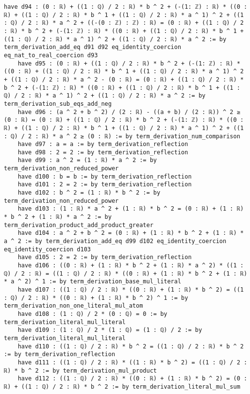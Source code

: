 \documentclass{article}
\begin{document}
\begin{tcolorbox}[colback=white!10, width=\linewidth]
\begin{lstlisting}[language=Lean4]
    have d94 : (0 : ℝ) + ((1 : ℚ) / 2 : ℝ) * b ^ 2 + (-(1: ℤ) : ℝ) * ((0 : ℝ) + ((1 : ℚ) / 2 : ℝ) * b ^ 1 + ((1 : ℚ) / 2 : ℝ) * a ^ 1) ^ 2 + ((1 : ℚ) / 2 : ℝ) * a ^ 2 + ((-(0 : ℤ) : ℤ) : ℝ) = (0 : ℝ) + ((1 : ℚ) / 2 : ℝ) * b ^ 2 + (-(1: ℤ) : ℝ) * ((0 : ℝ) + ((1 : ℚ) / 2 : ℝ) * b ^ 1 + ((1 : ℚ) / 2 : ℝ) * a ^ 1) ^ 2 + ((1 : ℚ) / 2 : ℝ) * a ^ 2 := by term_derivation_add_eq d91 d92 eq_identity_coercion eq_nat_to_real_coercion d93
    have d95 : (0 : ℝ) + ((1 : ℚ) / 2 : ℝ) * b ^ 2 + (-(1: ℤ) : ℝ) * ((0 : ℝ) + ((1 : ℚ) / 2 : ℝ) * b ^ 1 + ((1 : ℚ) / 2 : ℝ) * a ^ 1) ^ 2 + ((1 : ℚ) / 2 : ℝ) * a ^ 2 - (0 : ℝ) = (0 : ℝ) + ((1 : ℚ) / 2 : ℝ) * b ^ 2 + (-(1: ℤ) : ℝ) * ((0 : ℝ) + ((1 : ℚ) / 2 : ℝ) * b ^ 1 + ((1 : ℚ) / 2 : ℝ) * a ^ 1) ^ 2 + ((1 : ℚ) / 2 : ℝ) * a ^ 2 := by term_derivation_sub_eqs_add_neg
    have d96 : (a ^ 2 + b ^ 2) / (2 : ℝ) - ((a + b) / (2 : ℝ)) ^ 2 ≥ (0 : ℝ) ↔ (0 : ℝ) + ((1 : ℚ) / 2 : ℝ) * b ^ 2 + (-(1: ℤ) : ℝ) * ((0 : ℝ) + ((1 : ℚ) / 2 : ℝ) * b ^ 1 + ((1 : ℚ) / 2 : ℝ) * a ^ 1) ^ 2 + ((1 : ℚ) / 2 : ℝ) * a ^ 2 ≥ (0 : ℝ) := by term_derivation_num_comparison
    have d97 : a = a := by term_derivation_reflection
    have d98 : 2 = 2 := by term_derivation_reflection
    have d99 : a ^ 2 = (1 : ℝ) * a ^ 2 := by term_derivation_non_reduced_power
    have d100 : b = b := by term_derivation_reflection
    have d101 : 2 = 2 := by term_derivation_reflection
    have d102 : b ^ 2 = (1 : ℝ) * b ^ 2 := by term_derivation_non_reduced_power
    have d103 : (1 : ℝ) * a ^ 2 + (1 : ℝ) * b ^ 2 = (0 : ℝ) + (1 : ℝ) * b ^ 2 + (1 : ℝ) * a ^ 2 := by term_derivation_product_add_product_greater
    have d104 : a ^ 2 + b ^ 2 = (0 : ℝ) + (1 : ℝ) * b ^ 2 + (1 : ℝ) * a ^ 2 := by term_derivation_add_eq d99 d102 eq_identity_coercion eq_identity_coercion d103
    have d105 : 2 = 2 := by term_derivation_reflection
    have d106 : ((0 : ℝ) + (1 : ℝ) * b ^ 2 + (1 : ℝ) * a ^ 2) * ((1 : ℚ) / 2 : ℝ) = ((1 : ℚ) / 2 : ℝ) * ((0 : ℝ) + (1 : ℝ) * b ^ 2 + (1 : ℝ) * a ^ 2) ^ 1 := by term_derivation_base_mul_literal
    have d107 : ((1 : ℚ) / 2 : ℝ) * ((0 : ℝ) + (1 : ℝ) * b ^ 2) = ((1 : ℚ) / 2 : ℝ) * ((0 : ℝ) + (1 : ℝ) * b ^ 2) ^ 1 := by term_derivation_non_one_literal_mul_atom
    have d108 : (1 : ℚ) / 2 * (0 : ℚ) = 0 := by term_derivation_literal_mul_literal
    have d109 : (1 : ℚ) / 2 * (1 : ℚ) = (1 : ℚ) / 2 := by term_derivation_literal_mul_literal
    have d110 : ((1 : ℚ) / 2 : ℝ) * b ^ 2 = ((1 : ℚ) / 2 : ℝ) * b ^ 2 := by term_derivation_reflection
    have d111 : ((1 : ℚ) / 2 : ℝ) * ((1 : ℝ) * b ^ 2) = ((1 : ℚ) / 2 : ℝ) * b ^ 2 := by term_derivation_mul_product
    have d112 : ((1 : ℚ) / 2 : ℝ) * ((0 : ℝ) + (1 : ℝ) * b ^ 2) = (0 : ℝ) + ((1 : ℚ) / 2 : ℝ) * b ^ 2 := by term_derivation_literal_mul_sum

\end{lstlisting}
\end{tcolorbox}
\end{document}
